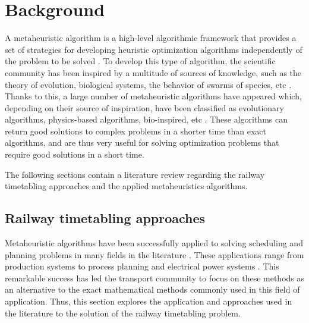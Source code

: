 \documentclass[Afour,sagev,times]{sagej}
\begin{document}
\section{Background}
\label{sec:Background}

A metaheuristic algorithm is a high-level algorithmic framework that provides a set of strategies for developing heuristic optimization algorithms independently of the problem to be solved \cite{Sorensen13}. To develop this type of algorithm, the scientific community has been inspired by a multitude of sources of knowledge, such as the theory of evolution, biological systems, the behavior of swarms of species, etc \cite{delSer19}. Thanks to this, a large number of metaheuristic algorithms have appeared which, depending on their source of inspiration, have been classified as evolutionary algorithms, physics-based algorithms, bio-inspired, etc \cite{Talbi02, Rajwar23}. These algorithms can return good solutions to complex problems in a shorter time than exact algorithms, and are thus very useful for solving optimization problems that require good solutions in a short time.

The following sections contain a literature review regarding the railway timetabling approaches and the applied metaheuristics algorithms.

\subsection{Railway timetabling approaches}

Metaheuristic algorithms have been successfully applied to solving scheduling and planning problems in many fields in the literature \cite{Zarandi20}. These applications range from production systems \cite{Neufeld23} to process planning \cite{Li15} and electrical power systems \cite{Morquecho24}. This remarkable success has led the transport community to focus on these methods as an alternative to the exact mathematical methods commonly used in this field of application. Thus, this section explores the application and approaches used in the literature to the solution of the railway timetabling problem.
\end{document}
